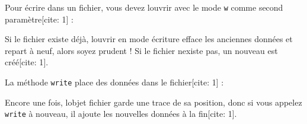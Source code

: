 Pour écrire dans un fichier, vous devez l\textquotesingle ouvrir avec le
mode \texttt{\textquotesingle{}w\textquotesingle{}} comme second
paramètre{[}cite: 1{]} :

\begin{Shaded}
\begin{Highlighting}[]
\OperatorTok{\textgreater{}\textgreater{}\textgreater{}}\OperatorTok{=} \NormalTok{(}\NormalTok{, }\NormalTok{)}
\OperatorTok{\textgreater{}\textgreater{}\textgreater{}} 
\OperatorTok{\textless{}}  \OperatorTok{\textgreater{}}
\end{Highlighting}
\end{Shaded}

Si le fichier existe déjà, l\textquotesingle ouvrir en mode écriture
efface les anciennes données et repart à neuf, alors soyez prudent ! Si
le fichier n\textquotesingle existe pas, un nouveau est créé{[}cite:
1{]}.

La méthode \texttt{write} place des données dans le fichier{[}cite: 1{]}
:

\begin{Shaded}
\begin{Highlighting}[]
\OperatorTok{\textgreater{}\textgreater{}\textgreater{}}\OperatorTok{=} 
\OperatorTok{\textgreater{}\textgreater{}\textgreater{}}
\end{Highlighting}
\end{Shaded}

Encore une fois, l\textquotesingle objet fichier garde une trace de sa
position, donc si vous appelez \texttt{write} à nouveau, il ajoute les
nouvelles données à la fin{[}cite: 1{]}.

\begin{Shaded}
\begin{Highlighting}[]
\OperatorTok{\textgreater{}\textgreater{}\textgreater{}}\OperatorTok{=} 
\OperatorTok{\textgreater{}\textgreater{}\textgreater{}}
\end{Highlighting}
\end{Shaded}

